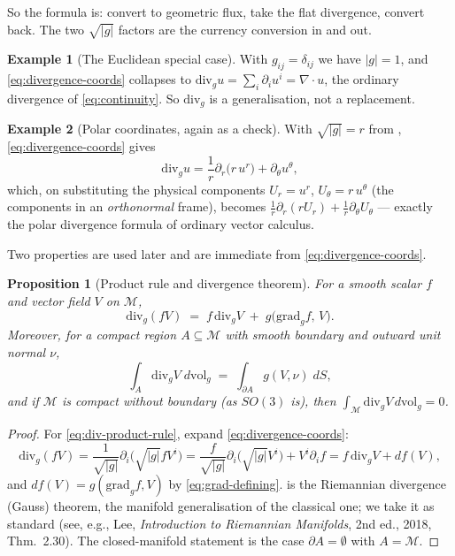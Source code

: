 \documentclass[11pt,a4paper]{report}
\newtheorem{proposition}[proposition]{Proposition}
\theoremstyle{definition}
\newtheorem{example}[example]{Example}
\theoremstyle{remark}
\begin{document}
So the formula is: convert to geometric flux, take the flat divergence,
convert back. The two $\sqrt{|g|}$ factors are the currency conversion in
and out.

\begin{example}[The Euclidean special case]
\label{ex:divergence-euclidean}
With $g_{ij}=\delta_{ij}$ we have $|g|=1$, and
\eqref{eq:divergence-coords} collapses to
$\mathrm{div}_gu=\sum_i\partial_iu^i=\nabla\cdot u$, the ordinary
divergence of \eqref{eq:continuity}. So $\mathrm{div}_g$ is a
generalisation, not a replacement.
\end{example}

\begin{example}[Polar coordinates, again as a check]
\label{ex:divergence-polar}
With $\sqrt{|g|}=r$ from ,
\eqref{eq:divergence-coords} gives
\[
\mathrm{div}_gu=\frac1r\partial_r\bigl(r\,u^r\bigr)+\partial_\theta u^\theta ,
\]
which, on substituting the physical components $U_r=u^r$, $U_\theta=r\,u^\theta$
(the components in an \emph{orthonormal} frame), becomes
$\frac1r\partial_r(rU_r)+\frac1r\partial_\theta U_\theta$ --- exactly the
polar divergence formula of ordinary vector calculus.
\end{example}

Two properties are used later and are immediate from
\eqref{eq:divergence-coords}.

\begin{proposition}[Product rule and divergence theorem]
\label{prop:divergence-facts}
For a smooth scalar $f$ and vector field $V$ on $\mathcal M$,
\begin{equation}
\label{eq:div-product-rule}
\mathrm{div}_g(fV) \;=\; f\,\mathrm{div}_gV \;+\; g\bigl(\mathrm{grad}_gf,\,V\bigr) .
\end{equation}
Moreover, for a compact region $A\subseteq\mathcal M$ with smooth boundary
and outward unit normal $\nu$,
\begin{equation}
\label{eq:divergence-theorem}
\int_A \mathrm{div}_gV\;d\mathrm{vol}_g \;=\; \int_{\partial A} g(V,\nu)\;dS ,
\end{equation}
and if $\mathcal M$ is compact without boundary (as $SO(3)$ is), then
$\int_{\mathcal M}\mathrm{div}_gV\,d\mathrm{vol}_g=0$.
\end{proposition}

\begin{proof}
For \eqref{eq:div-product-rule}, expand \eqref{eq:divergence-coords}:
\[
\mathrm{div}_g(fV)
=\frac{1}{\sqrt{|g|}}\partial_i\bigl(\sqrt{|g|}fV^i\bigr)
=\frac{f}{\sqrt{|g|}}\partial_i\bigl(\sqrt{|g|}V^i\bigr) + V^i\partial_if
= f\,\mathrm{div}_gV + df(V) ,
\]
and $df(V)=g(\mathrm{grad}_gf,V)$ by \eqref{eq:grad-defining}.
 is the Riemannian divergence (Gauss) theorem,
the manifold generalisation of the classical one; we take it as standard
(see, e.g., Lee, \emph{Introduction to Riemannian Manifolds}, 2nd ed., 2018,
Thm.~2.30). The closed-manifold statement is the case $\partial A=\emptyset$
with $A=\mathcal M$.
\end{proof}
\end{document}
